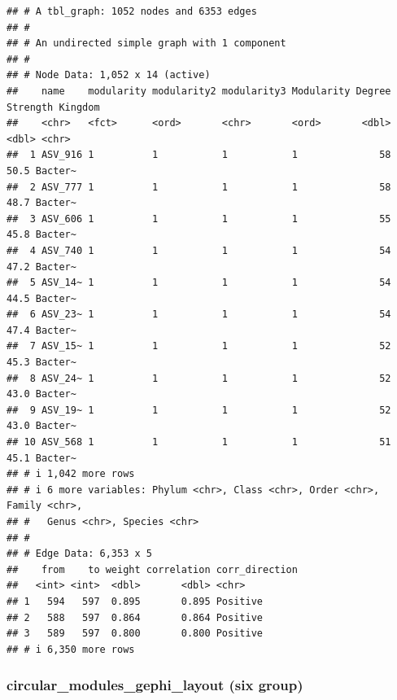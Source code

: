 \documentclass[
]{book}
\newenvironment{Shaded}{\begin{snugshade}}{\end{snugshade}}
\newcommand{\AttributeTok}[1]{\textcolor[rgb]{0.13,0.29,0.53}{#1}}
\newcommand{\DecValTok}[1]{\textcolor[rgb]{0.00,0.00,0.81}{#1}}
\newcommand{\FunctionTok}[1]{\textcolor[rgb]{0.13,0.29,0.53}{\textbf{#1}}}
\newcommand{\NormalTok}[1]{#1}
\newcommand{\OtherTok}[1]{\textcolor[rgb]{0.56,0.35,0.01}{#1}}
\newcommand{\SpecialCharTok}[1]{\textcolor[rgb]{0.81,0.36,0.00}{\textbf{#1}}}
\newcommand{\StringTok}[1]{\textcolor[rgb]{0.31,0.60,0.02}{#1}}
\begin{document}
\begin{verbatim}
## # A tbl_graph: 1052 nodes and 6353 edges
## #
## # An undirected simple graph with 1 component
## #
## # Node Data: 1,052 x 14 (active)
##    name    modularity modularity2 modularity3 Modularity Degree Strength Kingdom
##    <chr>   <fct>      <ord>       <chr>       <ord>       <dbl>    <dbl> <chr>  
##  1 ASV_916 1          1           1           1              58     50.5 Bacter~
##  2 ASV_777 1          1           1           1              58     48.7 Bacter~
##  3 ASV_606 1          1           1           1              55     45.8 Bacter~
##  4 ASV_740 1          1           1           1              54     47.2 Bacter~
##  5 ASV_14~ 1          1           1           1              54     44.5 Bacter~
##  6 ASV_23~ 1          1           1           1              54     47.4 Bacter~
##  7 ASV_15~ 1          1           1           1              52     45.3 Bacter~
##  8 ASV_24~ 1          1           1           1              52     43.0 Bacter~
##  9 ASV_19~ 1          1           1           1              52     43.0 Bacter~
## 10 ASV_568 1          1           1           1              51     45.1 Bacter~
## # i 1,042 more rows
## # i 6 more variables: Phylum <chr>, Class <chr>, Order <chr>, Family <chr>,
## #   Genus <chr>, Species <chr>
## #
## # Edge Data: 6,353 x 5
##    from    to weight correlation corr_direction
##   <int> <int>  <dbl>       <dbl> <chr>         
## 1   594   597  0.895       0.895 Positive      
## 2   588   597  0.864       0.864 Positive      
## 3   589   597  0.800       0.800 Positive      
## # i 6,350 more rows
\end{verbatim}

\subsubsection{circular\_modules\_gephi\_layout (six group)}\label{circular_modules_gephi_layout-six-group}

\begin{Shaded}
\end{Shaded}
\end{document}

